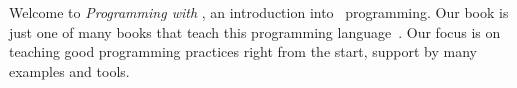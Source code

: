 \hsection{}%
%
%
Welcome to \emph{Programming with \python}, an introduction into \python\ programming.
Our book is just one of many books that teach this programming language~\cite{K2018EIPFEUU,A2002PC,H2023ABGTP3P,LH2015DSAAWP}.
Our focus is on teaching good programming practices right from the start, support by many examples and tools.%
%
%
%
%
\endhsection\endhsection%
%
